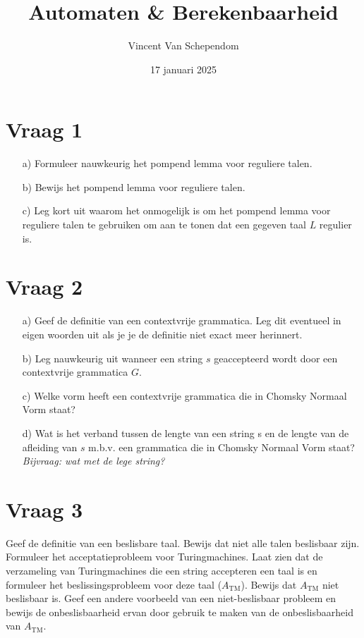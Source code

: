 \documentclass[kulak]{kulakarticle}
\title{Automaten \& Berekenbaarheid}
\author{Vincent Van Schependom}
\date{17 januari 2025}
\begin{document}
	\maketitle

	\section*{Vraag 1}

	\begin{enumerate}
		\item[a)] Formuleer nauwkeurig het pompend lemma voor reguliere talen.
		\item[b)] Bewijs het pompend lemma voor reguliere talen.
		\item[c)] Leg kort uit waarom het onmogelijk is om het pompend lemma voor reguliere talen te gebruiken om aan te tonen dat een gegeven taal \(L\) regulier is.
	\end{enumerate}

	\section*{Vraag 2}

	\begin{enumerate}
		\item[a)] Geef de definitie van een contextvrije grammatica. Leg dit eventueel in eigen woorden uit als je je de definitie niet exact meer herinnert.
		\item[b)] Leg nauwkeurig uit wanneer een string \(s\) geaccepteerd wordt door een contextvrije grammatica \(G\).
		\item[c)] Welke vorm heeft een contextvrije grammatica die in Chomsky Normaal Vorm staat?
		\item[d)] Wat is het verband tussen de lengte van een string s en de lengte van de afleiding van \(s\) m.b.v. een grammatica die in Chomsky Normaal Vorm staat? \\
		\textit{Bijvraag: wat met de lege string?}
	\end{enumerate}

	\section*{Vraag 3}

	Geef de definitie van een beslisbare taal. Bewijs dat niet alle talen beslisbaar zijn. Formuleer het acceptatieprobleem voor Turingmachines. Laat zien dat de verzameling van Turingmachines die een string accepteren een taal is en formuleer het beslissingsprobleem voor deze taal (\(A_\text{TM}\)). Bewijs dat \(A_\text{TM}\) niet beslisbaar is. Geef een andere voorbeeld van een niet-beslisbaar probleem en bewijs de onbeslisbaarheid ervan door gebruik te maken van de onbeslisbaarheid van \(A_\text{TM}\).
\end{document}
